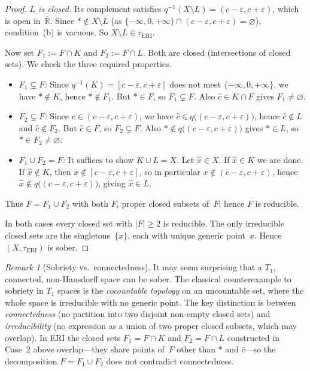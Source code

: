 \documentclass[11pt]{article}
\theoremstyle{definition}
\theoremstyle{remark}
\newtheorem{remark}[theorem]{Remark}
\begin{document}
\begin{proof}
\emph{$L$ is closed.}\;
Its complement satisfies
$q^{-1}(X \setminus L) = (c-\varepsilon, c+\varepsilon)$, which is open
in~$\overline{\mathbb{R}}$.
Since $\ast \notin X \setminus L$ (as
$\{-\infty, 0, +\infty\} \cap (c-\varepsilon,c+\varepsilon) = \varnothing$),
condition~(b) is vacuous.  So $X \setminus L \in \tau_{\mathrm{ERI}}$.

Now set $F_1 := F \cap K$ and $F_2 := F \cap L$.  Both are closed
(intersections of closed sets).  We check the three required properties.
\begin{itemize}[nosep]
\item \emph{$F_1 \subsetneq F$:}\;
  Since $q^{-1}(K) = [c-\varepsilon,c+\varepsilon]$ does not meet
  $\{-\infty,0,+\infty\}$, we have $\ast \notin K$, hence
  $\ast \notin F_1$.  But $\ast \in F$, so $F_1 \subsetneq F$.
  Also $\hat{c} \in K \cap F$ gives $F_1 \neq \varnothing$.
\item \emph{$F_2 \subsetneq F$:}\;
  Since $c \in (c-\varepsilon,c+\varepsilon)$, we have
  $\hat{c} \in q\bigl((c-\varepsilon,c+\varepsilon)\bigr)$, hence
  $\hat{c} \notin L$ and $\hat{c} \notin F_2$.  But $\hat{c} \in F$,
  so $F_2 \subsetneq F$.
  Also $\ast \notin q\bigl((c-\varepsilon,c+\varepsilon)\bigr)$ gives
  $\ast \in L$, so $\ast \in F_2 \neq \varnothing$.
\item \emph{$F_1 \cup F_2 = F$:}\;
  It suffices to show $K \cup L = X$.  Let $\hat{x} \in X$.  If
  $\hat{x} \in K$ we are done.  If $\hat{x} \notin K$, then
  $x \notin [c-\varepsilon, c+\varepsilon]$, so in particular
  $x \notin (c-\varepsilon, c+\varepsilon)$, hence
  $\hat{x} \notin q\bigl((c-\varepsilon,c+\varepsilon)\bigr)$, giving
  $\hat{x} \in L$.
\end{itemize}
Thus $F = F_1 \cup F_2$ with both $F_i$ proper closed subsets
of~$F$; hence $F$ is reducible.

\medskip
In both cases every closed set with $|F| \geq 2$ is reducible.
The only irreducible closed sets are the singletons~$\{x\}$, each with
unique generic point~$x$.  Hence $(X, \tau_{\mathrm{ERI}})$ is sober.
\end{proof}

\begin{remark}[Sobriety vs.\ connectedness]\label{rmk:sober-subtlety}
It may seem surprising that a $T_1$, connected, non-Hausdorff space
can be sober.
The classical counterexample to sobriety in $T_1$ spaces is the
\emph{cocountable topology} on an uncountable set, where the whole
space is irreducible with no generic point.
The key distinction is between \emph{connectedness} (no partition
into two disjoint non-empty closed sets) and \emph{irreducibility}
(no expression as a union of two proper closed subsets, which may
overlap).
In ERI the closed sets $F_1 = F \cap K$ and $F_2 = F \cap L$
constructed in Case~2 above overlap---they share points of~$F$
other than $\ast$ and $\hat{c}$---so the decomposition
$F = F_1 \cup F_2$ does not contradict connectedness.
\end{remark}
\end{document}
